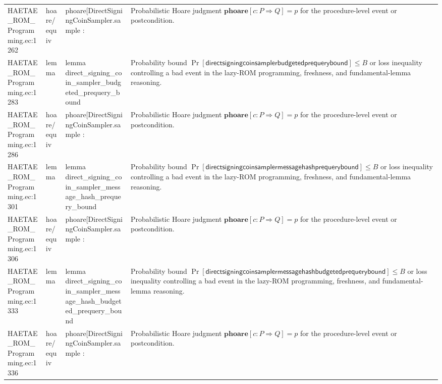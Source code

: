 \documentclass[10pt]{article}
\begin{document}
\begin{longtable}{L{0.11\textwidth}L{0.055\textwidth}L{0.385\textwidth}L{0.41\textwidth}}
HAETAE\_\allowbreak{}ROM\_\allowbreak{}Programming.\allowbreak{}ec:\allowbreak{}1262 & hoare/equiv & {\ttfamily\scriptsize phoare[DirectSigningCoinSampler.sample :} & Probabilistic Hoare judgment $\mathbf{phoare}[c:P\Rightarrow Q]=p$ for the procedure-level event or postcondition. \\
HAETAE\_\allowbreak{}ROM\_\allowbreak{}Programming.\allowbreak{}ec:\allowbreak{}1283 & lemma & {\ttfamily\scriptsize lemma direct\_\allowbreak{}signing\_\allowbreak{}coin\_\allowbreak{}sampler\_\allowbreak{}budgeted\_\allowbreak{}prequery\_\allowbreak{}bound} & Probability bound $\Pr[\mathsf{directsigningcoinsamplerbudgetedprequerybound}]\le B$ or loss inequality controlling a bad event in the lazy-ROM programming, freshness, and fundamental-lemma reasoning. \\
HAETAE\_\allowbreak{}ROM\_\allowbreak{}Programming.\allowbreak{}ec:\allowbreak{}1286 & hoare/equiv & {\ttfamily\scriptsize phoare[DirectSigningCoinSampler.sample :} & Probabilistic Hoare judgment $\mathbf{phoare}[c:P\Rightarrow Q]=p$ for the procedure-level event or postcondition. \\
HAETAE\_\allowbreak{}ROM\_\allowbreak{}Programming.\allowbreak{}ec:\allowbreak{}1301 & lemma & {\ttfamily\scriptsize lemma direct\_\allowbreak{}signing\_\allowbreak{}coin\_\allowbreak{}sampler\_\allowbreak{}message\_\allowbreak{}hash\_\allowbreak{}prequery\_\allowbreak{}bound} & Probability bound $\Pr[\mathsf{directsigningcoinsamplermessagehashprequerybound}]\le B$ or loss inequality controlling a bad event in the lazy-ROM programming, freshness, and fundamental-lemma reasoning. \\
HAETAE\_\allowbreak{}ROM\_\allowbreak{}Programming.\allowbreak{}ec:\allowbreak{}1306 & hoare/equiv & {\ttfamily\scriptsize phoare[DirectSigningCoinSampler.sample :} & Probabilistic Hoare judgment $\mathbf{phoare}[c:P\Rightarrow Q]=p$ for the procedure-level event or postcondition. \\
HAETAE\_\allowbreak{}ROM\_\allowbreak{}Programming.\allowbreak{}ec:\allowbreak{}1333 & lemma & {\ttfamily\scriptsize lemma direct\_\allowbreak{}signing\_\allowbreak{}coin\_\allowbreak{}sampler\_\allowbreak{}message\_\allowbreak{}hash\_\allowbreak{}budgeted\_\allowbreak{}prequery\_\allowbreak{}bound} & Probability bound $\Pr[\mathsf{directsigningcoinsamplermessagehashbudgetedprequerybound}]\le B$ or loss inequality controlling a bad event in the lazy-ROM programming, freshness, and fundamental-lemma reasoning. \\
HAETAE\_\allowbreak{}ROM\_\allowbreak{}Programming.\allowbreak{}ec:\allowbreak{}1336 & hoare/equiv & {\ttfamily\scriptsize phoare[DirectSigningCoinSampler.sample :} & Probabilistic Hoare judgment $\mathbf{phoare}[c:P\Rightarrow Q]=p$ for the procedure-level event or postcondition. \\

\end{longtable}
\end{document}

